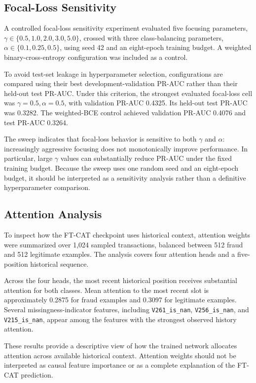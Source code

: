 \documentclass[conference]{IEEEtran}
\begin{document}
\subsection{Focal-Loss Sensitivity}

A controlled focal-loss sensitivity experiment evaluated five focusing
parameters,
$\gamma \in \{0.5,1.0,2.0,3.0,5.0\}$, crossed with three class-balancing
parameters,
$\alpha \in \{0.1,0.25,0.5\}$, using seed 42 and an eight-epoch training
budget. A weighted binary-cross-entropy configuration was included as a
control.

To avoid test-set leakage in hyperparameter selection, configurations are
compared using their best development-validation PR-AUC rather than their
held-out test PR-AUC. Under this criterion, the strongest evaluated focal-loss
cell was $\gamma=0.5,\alpha=0.5$, with validation PR-AUC 0.4325. Its held-out
test PR-AUC was 0.3282. The weighted-BCE control achieved validation PR-AUC
0.4076 and test PR-AUC 0.3264.

The sweep indicates that focal-loss behavior is sensitive to both $\gamma$ and
$\alpha$: increasingly aggressive focusing does not monotonically improve
performance. In particular, large $\gamma$ values can substantially reduce
PR-AUC under the fixed training budget. Because the sweep uses one random seed
and an eight-epoch budget, it should be interpreted as a sensitivity analysis
rather than a definitive hyperparameter comparison.

\subsection{Attention Analysis}

To inspect how the FT-CAT checkpoint uses historical context, attention weights
were summarized over 1,024 sampled transactions, balanced between 512 fraud and
512 legitimate examples. The analysis covers four attention heads and a
five-position historical sequence.

Across the four heads, the most recent historical position receives substantial
attention for both classes. Mean attention to the most recent slot is
approximately 0.2875 for fraud examples and 0.3097 for legitimate examples.
Several missingness-indicator features, including \texttt{V261\_is\_nan},
\texttt{V256\_is\_nan}, and \texttt{V215\_is\_nan}, appear among the features
with the strongest observed history attention.

These results provide a descriptive view of how the trained network allocates
attention across available historical context. Attention weights should not be
interpreted as causal feature importance or as a complete explanation of the
FT-CAT prediction.
\end{document}
